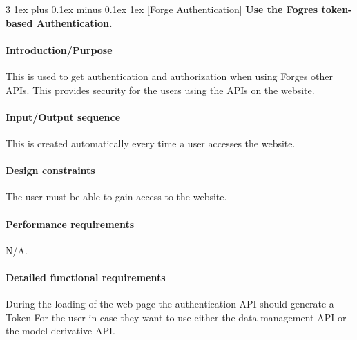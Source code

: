 \documentclass[letterpaper, 10pt, draftclsnofoot, compsoc, onecolumn]{IEEEtran}
\makeatletter
\def\subsubsection{\@startsection{subsubsection}%
                                 {3}%
                                 {\z@}%
                                 {1ex plus 0.1ex minus 0.1ex}%
                                 {1ex}%
                                 {\normalfont\normalsize}}%
\makeatother
\begin{document}

\subsubsection[{Forge Authentication}]{\rmfamily\bfseries\color{black}
	Use the Fogres token-based Authentication.
}

\paragraph[Introduction/Purpose of this
feature]{\rmfamily\bfseries\color{black}
Introduction/Purpose }
	This is used to get authentication and authorization when using Forges other APIs. This provides security for the users using 
	the APIs on the website. 

\paragraph[Input/Output sequence for this
feature]{\rmfamily\bfseries\color{black}
Input/Output sequence }
	This is created automatically every time a user accesses the website.

\paragraph[Design constraints of this
feature]{\rmfamily\bfseries\color{black} Design constraints }
	The user must be able to gain access to the website.


\paragraph[Performance requirements of this
feature]{\rmfamily\bfseries\color{black}
Performance requirements }
	N/A. 

\paragraph[Detailed functional requirements of this
feature]{\rmfamily\bfseries\color{black}
Detailed functional requirements }
	During the loading of the web page the authentication API should generate a Token For the user in case they want to use 
	either the data management API or the model derivative API. 

\end{document}
